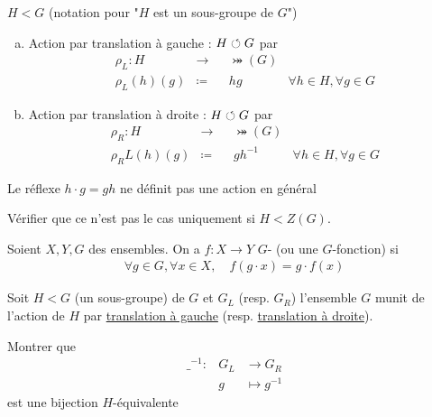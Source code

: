 \documentclass[french,a4paper,10pt]{article}
\begin{document}
	
	\begin{myexample}
		$H<G$ (notation pour "$H$ est un sous-groupe de $G$")
		\begin{enumerate}[(a)]
			\item 
			Action par translation à gauche : $H\circlearrowleft G$ par
			\[\begin{aligned}
				\rho_L\colon H&\to&&\bij(G)\\
				\rho_L(h)(g)&\coloneq& &hg&\forall h\in H, \forall g\in G
			\end{aligned}\]
			
			\item 
			Action par translation à droite : $H\circlearrowleft G$ par
			\[\begin{aligned}
				\rho_R\colon H&\to&&\bij(G)\\
				\rho_RL(h)(g)&\coloneq& &gh^{-1}&\forall h\in H, \forall g\in G
			\end{aligned}\]
			
		\end{enumerate}
		\begin{myremark}
			Le réflexe $h\cdot g = gh$ ne définit pas une action en général
			\begin{myexercice}
				Vérifier que ce n'est pas le cas uniquement si $H<Z(G)$.
			\end{myexercice}
		\end{myremark}
	\end{myexample}
	\begin{definition}
		Soient $X, Y, G$ des ensembles. On a $f\colon X\to Y$ $G$- (ou une $G$-fonction) si
			\[\begin{aligned}
				\forall g\in G,\forall x\in X,\quad f(g\cdot x)=g\cdot f(x)
			\end{aligned}\]
	\end{definition}
	\begin{myexercice}
		Soit $H<G$ (un sous-groupe) de $G$ et \color{astral}\underline{\color{black}$G_L$}\color{black} (resp. \color{verdant}\underline{\color{black}$G_R$}\color{black}) l'ensemble $G$ munit de l'action de $H$ par \color{astral}\underline{\color{black}translation à gauche}\color{black} (resp. \color{verdant}\underline{\color{black}translation à droite}\color{black}).
		
		Montrer que
			\[\begin{aligned}
				{\_}^{-1}\colon&G_L&\to G_R\\
				&g&\mapsto g^{-1}
			\end{aligned}\]
		est une bijection $H$-équivalente
	\end{myexercice}
\end{document}
